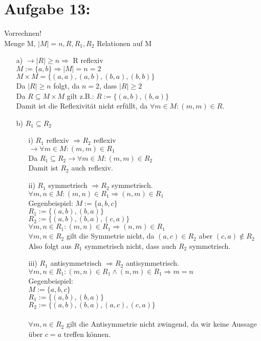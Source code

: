 \documentclass[paper = a4, ngerman]{scrartcl}
\begin{document}
\section*{Aufgabe 13:}
Vorrechnen!\\

Menge M, $|M| = n, R, R_1, R_2 $ Relationen auf M\\

\begin{itemize}
	\item[a)]
		$\rightarrow |R| \ge n \Rightarrow $ R reflexiv\\
		$M := \{a,b\} \Rightarrow |M| = n = 2$\\
		$M \times M = \{(a,a),(a,b),(b,a),(b,b)\}$\\
		Da $|R| \ge n$ folgt, da $n = 2$, dass $|R| \ge 2$\\
		Da $R \subseteq M \times M$ gilt z.B.: $R := \{(a,b),(b,a)\}$\\
		Damit ist die Reflexivität nicht erfüllt, da $\forall m \in M : (m,m) \in R$.\\
	\item[b)]
		$R_1 \subseteq R_2$
		\begin{itemize}
			\item[i)]
				$R_1$ reflexiv $\Rightarrow R_2 $ reflexiv\\
				$\rightarrow \forall m \in M : (m,m) \in R_1$\\ Da $R_1 \subseteq R_2 \rightarrow \forall m \in M : (m,m) \in R_2$\\ Damit ist $R_2$ auch reflexiv.
			\item[ii)]
				$R_1 $ symmetrisch $\Rightarrow R_2 $ symmetrisch.\\
				$\forall m,n \in M : (m,n) \in R_1 \Rightarrow (n,m) \in R_1$\\
				Gegenbeispiel: $M := \{a,b,c\}$\\
				$R_1 := \{(a,b),(b,a)\}$\\
				$R_2 := \{(a,b),(b,a),(c,a)\}$\\
				$\forall m,n \in R_1 : (m,n) \in R_1 \Rightarrow (n,m) \in R_1$\\
				$\forall m,n \in R_2 $ gilt die Symmetrie nicht, da $(a,c) \in R_2$ aber $(c,a) \notin R_2 $\\
				
				Also folgt aus 	$R_1 $ symmetrisch nicht, dass auch $R_2$ symmetrisch.
\pagebreak
			\item[iii)]
				$R_1$ antisymmetrisch $\Rightarrow R_2$ antisymmetrisch.\\
				$\forall m,n \in R_1 : (m,n) \in R_1 \wedge (n,m) \in R_1 \Rightarrow m = n$\\
				Gegenbeispiel:\\
				$M := \{a,b,c\}$\\
				$R_1 := \{(a,b),(b,a)\}$\\
				$R_2 := \{(a,b),(b,a),(a,c),(c,a)\}$\\\\
				$\forall m,n \in R_2 $ gilt die Antisymmetrie nicht zwingend, da wir keine Aussage über $ c = a $ treffen können.\\
				

\end{itemize}
\end{itemize}
\end{document}
